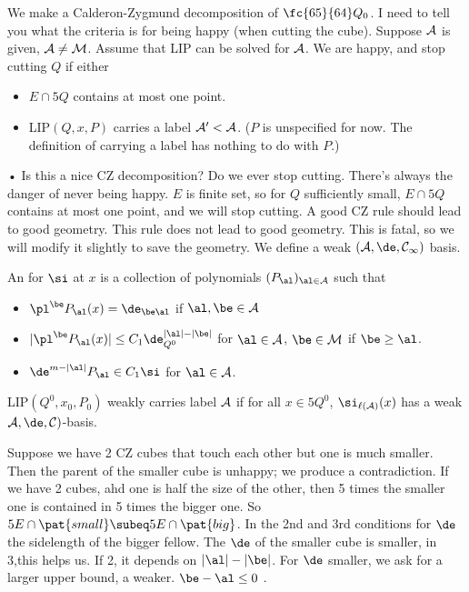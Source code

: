 We make a Calderon-Zygmund decomposition of $\fc{65}{64}Q_0$. I need to tell you what the criteria is for being happy (when cutting the cube).
Suppose $\cal A$ is given, $\cal A\ne \cal M$. Assume that LIP can be solved for $\cal A$. 
We are happy, and stop cutting $Q$ if either 
\begin{itemize}
\item
$E\cap 5Q$ contains at most one point.
\item
LIP$(Q,x,P)$ carries a label $\cal A'<\cal A$. ($P$ is unspecified for now. The definition of carrying a label has nothing to do with $P$.)
\end{itemize}•
Is this a nice CZ decomposition? Do we ever stop cutting. There's always the danger of never being happy. $E$ is finite set, so for $Q$ sufficiently small, $E\cap 5Q$ contains at most one point, and we will stop cutting. %
A good CZ rule should lead to good geometry. This rule does not lead to good geometry. %
This is fatal, so we will modify it slightly to save the geometry. We define a weak $(\cal A,\de,C_1)$ basis.
\begin{df}%
An  for $\si$ at $x$ is a collection of polynomials $(P_\al)_{\al\in \cal A}$ such that 
\begin{itemize}
\item
$\pl^\be P_\al(x)=\de_{\be \al}$ if $\al,\be\in \cal A$
\item
$|\pl^\be P_\al(x)|\le C_1 \de_{Q^0}^{|\al|-|\be|}$ for $\al\in \cal A$, $\be \in \cal M$ if $\be \ge \al$.
\item
$\de^{m-|\al|}P_\al \in C_1\si$ for $\al\in \cal A$. 
\end{itemize}
LIP$(Q^0,x_0,P_0)$ weakly carries label $\cal A$ if for all $x\in 5Q^0$, $\si_{\ell(\cal A)}(x)$ has a weak $\cal A,\de,C)$-basis. 
\end{df}
Suppose we have 2 CZ cubes that touch each other but one is much smaller. Then the parent of the smaller cube is unhappy; we produce a contradiction.
If we have 2 cubes, ahd one is half the size of the other, then 5 times the smaller one is contained in 5 times the bigger one.
So $5E\cap \pat{small}\subeq 5 E \cap \pat{big}$. In the 2nd and 3rd conditions for $\de$ the sidelength of the bigger fellow.
The $\de$ of the smaller cube is smaller,  in 3,this helps us. %
If 2, it depends on $|\al|-|\be|$. For $\de$ smaller, we ask for a larger upper bound, a weaker. $\be - \al\le 0$ . %


